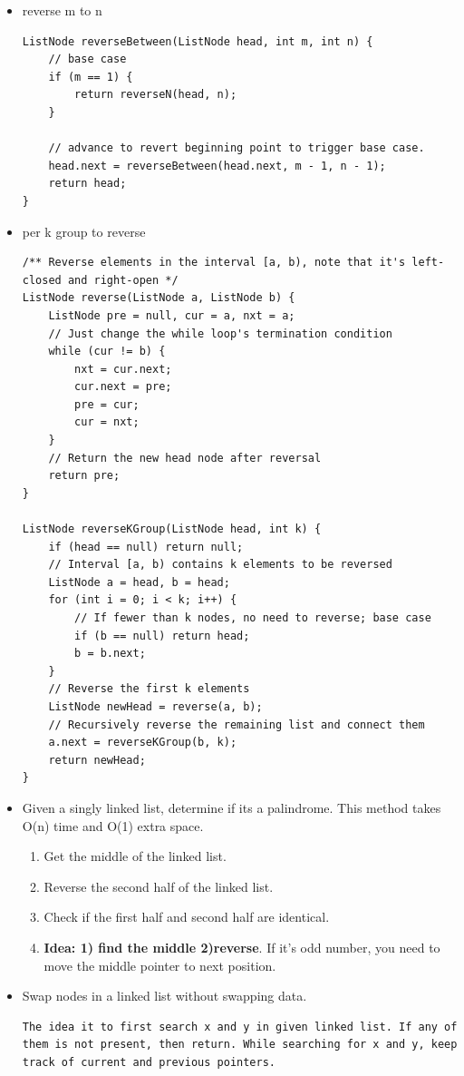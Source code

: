\documentclass[a4paper,11pt,twoside]{book}
\begin{document}
\begin{itemize}
\item reverse m to n 
\begin{lstlisting}
ListNode reverseBetween(ListNode head, int m, int n) {
	// base case
	if (m == 1) {
		return reverseN(head, n);
	}
	
	// advance to revert beginning point to trigger base case.
	head.next = reverseBetween(head.next, m - 1, n - 1);
	return head;
}
\end{lstlisting}


\item per k group to reverse 
\begin{lstlisting}
/** Reverse elements in the interval [a, b), note that it's left-closed and right-open */
ListNode reverse(ListNode a, ListNode b) {
	ListNode pre = null, cur = a, nxt = a;
	// Just change the while loop's termination condition
	while (cur != b) {
		nxt = cur.next;
		cur.next = pre;
		pre = cur;
		cur = nxt;
	}
	// Return the new head node after reversal
	return pre;
}

ListNode reverseKGroup(ListNode head, int k) {
	if (head == null) return null;
	// Interval [a, b) contains k elements to be reversed
	ListNode a = head, b = head;
	for (int i = 0; i < k; i++) {
		// If fewer than k nodes, no need to reverse; base case
		if (b == null) return head;
		b = b.next;
	}
	// Reverse the first k elements
	ListNode newHead = reverse(a, b);
	// Recursively reverse the remaining list and connect them
	a.next = reverseKGroup(b, k);
	return newHead;
}
\end{lstlisting}

	\item Given a singly linked list, determine if its a palindrome. This method takes O(n) time and O(1) extra space.
\begin{enumerate}
	\item Get the middle of the linked list.
	\item Reverse the second half of the linked list.
	\item Check if the first half and second half are identical.
	\item \textbf{Idea: 1) find the middle 2)reverse}. If it's odd number,  you need to move the middle pointer to next position.
\end{enumerate}


	\item Swap nodes in a linked list without swapping data. 
\begin{lstlisting}[breaklines]
The idea it to first search x and y in given linked list. If any of them is not present, then return. While searching for x and y, keep track of current and previous pointers.
\end{lstlisting}




\end{itemize}
\end{document}

